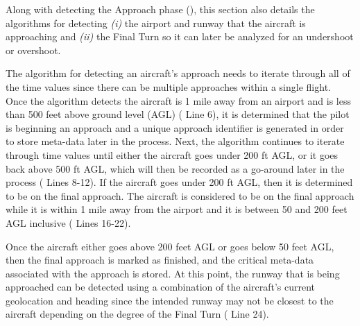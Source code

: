         Along with detecting the Approach phase (), this section also details the algorithms for detecting \textit{(i)} the airport and runway that the aircraft is approaching and \textit{(ii)} the Final Turn so it can later be analyzed for an undershoot or overshoot.
        
        The algorithm for detecting an aircraft's approach needs to iterate through all of the time values since there can be multiple approaches within a single flight.  Once the algorithm detects the aircraft is 1 mile away from an airport and is less than 500 feet above ground level (AGL) ( Line 6), it is determined that the pilot is beginning an approach and a unique approach identifier is generated in order to store meta-data later in the process.  Next, the algorithm continues to iterate through time values until either the aircraft goes under 200 ft AGL, or it goes back above 500 ft AGL, which will then be recorded as a go-around later in the process ( Lines 8-12).  If the aircraft goes under 200 ft AGL, then it is determined to be on the final approach.  The aircraft is considered to be on the final approach while it is within 1 mile away from the airport and it is between 50 and 200 feet AGL inclusive ( Lines 16-22).
    
    Once the aircraft either goes above 200 feet AGL or goes below 50 feet AGL, then the final approach is marked as finished, and the critical meta-data associated with the approach is stored.  At this point, the runway that is being approached can be detected using a combination of the aircraft's current geolocation and heading since the intended runway may not be closest to the aircraft depending on the degree of the Final Turn ( Line 24).
        
